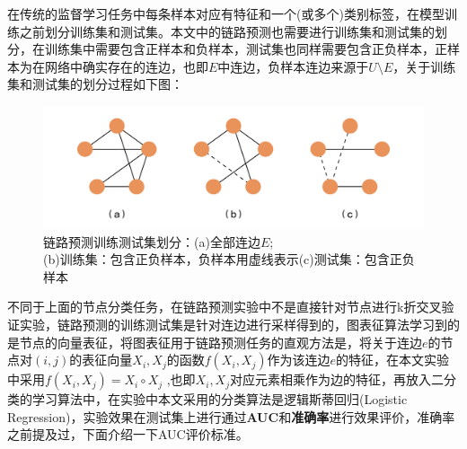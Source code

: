 在传统的监督学习任务中每条样本对应有特征和一个(或多个)类别标签，在模型训练之前划分训练集和测试集。本文中的链路预测也需要进行训练集和测试集的划分，在训练集中需要包含正样本和负样本，测试集也同样需要包含正负样本，正样本为在网络中确实存在的连边，也即$E$中连边，负样本连边来源于$U\setminus E$，关于训练集和测试集的划分过程如下图：
\begin{figure}
	\centering
	\includegraphics[width=6in]{figures/link_prediction_split}
	\caption{链路预测训练测试集划分：(a)全部连边$E$;\\(b)训练集：包含正负样本，负样本用虚线表示(c)测试集：包含正负样本}
\end{figure}

不同于上面的节点分类任务，在链路预测实验中不是直接针对节点进行k折交叉验证实验，链路预测的训练测试集是针对连边进行采样得到的，图表征算法学习到的是节点的向量表征，将图表征用于链路预测任务的直观方法是，将关于连边$e$的节点对$(i,j)$的表征向量$X_i,X_j$的函数$f(X_i, X_j)$作为该连边$e$的特征，在本文实验中采用$f(X_i, X_j) = X_i\circ X_j$ ,也即$X_i, X_j$对应元素相乘作为边的特征，再放入二分类的学习算法中，在实验中本文采用的分类算法是逻辑斯蒂回归(Logistic Regression)，实验效果在测试集上进行通过\textbf{AUC}和\textbf{准确率}进行效果评价，准确率之前提及过，下面介绍一下AUC评价标准。

